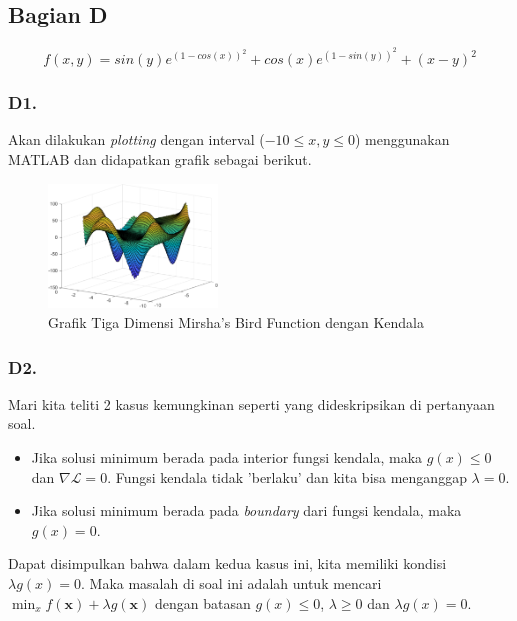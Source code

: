 \documentclass[11pt, a4paper, onecolumn, oneside, final]{report}
\begin{document}
\subsection*{Bagian D}

$$
f(x, y) = sin(y)e^{(1-cos(x))^2}+cos(x)e^{(1-sin(y))^2}+(x-y)^2
$$

\subsubsection*{D1.}
Akan dilakukan \textit{plotting} dengan interval ($-10 \leq x, y \leq 0$) menggunakan MATLAB dan didapatkan grafik sebagai berikut.


\begin{figure}[h!]
    \centering
    \includegraphics[width=0.4\textwidth]{assets/birdplotwithbound.png}
    \caption{Grafik Tiga Dimensi Mirsha's Bird Function dengan Kendala}
\end{figure}

\subsubsection*{D2.}
Mari kita teliti 2 kasus kemungkinan seperti yang dideskripsikan di pertanyaan soal.
\begin{itemize}
    \item Jika solusi minimum berada pada interior fungsi kendala, maka $g(x) \leq 0$ dan $\nabla \mathcal{L} = 0$. Fungsi kendala tidak 'berlaku' dan kita bisa menganggap $\lambda = 0$. 
    \item Jika solusi minimum berada pada \textit{boundary} dari fungsi kendala, maka $g(x) = 0$.
\end{itemize}
Dapat disimpulkan bahwa dalam kedua kasus ini, kita memiliki kondisi $\lambda g(x) = 0$. Maka masalah di soal ini adalah untuk mencari $\min_{x} f(\mathbf{x}) + \lambda g(\mathbf{x})$ dengan batasan $g(x) \leq 0$, $\lambda \geq 0$ dan $\lambda g(x) = 0$.
\end{document}
